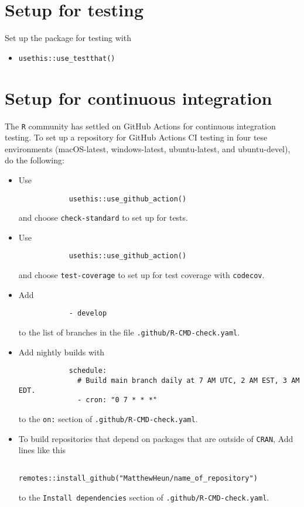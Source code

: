 \documentclass{article}
\begin{document}
\section{Setup for testing} 
\label{sec:testing_setup}

Set up the package for testing with

\begin{itemize}

  \item \verb|usethis::use_testthat()|

\end{itemize}


\section{Setup for continuous integration}
\label{sec:ci_setup}

The \texttt{R} community has settled on GitHub Actions for continuous integration testing.
To set up a repository for GitHub Actions CI testing in four tese environments
(macOS-latest, windows-latest, ubuntu-latest, and ubuntu-devel), 
do the following:
%
\begin{itemize}

  \item Use 
  		\begin{verbatim}
			usethis::use_github_action()
  	 	\end{verbatim}
		and choose \verb|check-standard| to set up for tests.
        
  \item Use 
  		\begin{verbatim}
			usethis::use_github_action()
  	 	\end{verbatim}
		and choose \verb|test-coverage| to set up for test coverage with \verb|codecov|.
        
  \item Add 
  		\begin{verbatim}
			- develop
		\end{verbatim}
		to the list of branches in the file \texttt{.github/R-CMD-check.yaml}.
  
  \item Add nightly builds with 
  		\begin{verbatim}
			schedule:
			  # Build main branch daily at 7 AM UTC, 2 AM EST, 3 AM EDT.
			  - cron: "0 7 * * *"
		\end{verbatim}
	    to the \texttt{on:} section of \texttt{.github/R-CMD-check.yaml}.\
		
  \item To build repositories that depend on packages that are outside of \texttt{CRAN}, 
		Add lines like this
	        \begin{verbatim}
				remotes::install_github("MatthewHeun/name_of_repository")
			\end{verbatim}
		to the \texttt{Install dependencies} section of
		\texttt{.github/R-CMD-check.yaml}.
		
\end{itemize}
\end{document}
